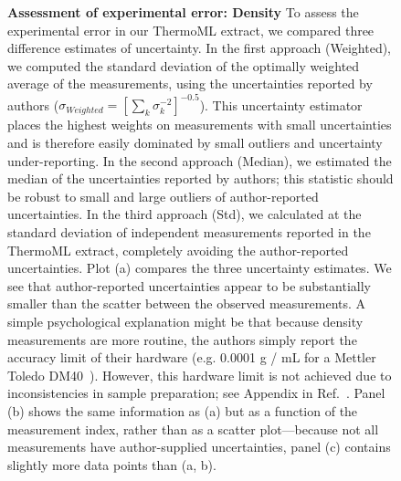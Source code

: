 \documentclass[aps,pre,twocolumn,nofootinbib,superscriptaddress,linenumbers]{revtex4-1}
\begin{document}
\begin{figure}
\caption{{\bf Assessment of experimental error: Density}
To assess the experimental error in our ThermoML extract, we compared three difference estimates of uncertainty.  
In the first approach (Weighted), we computed the standard deviation of the optimally weighted average of the measurements, using the uncertainties reported by authors ($\sigma_{Weighted} = [\sum_k \sigma_k^{-2}]^{-0.5}$).
This uncertainty estimator places the highest weights on measurements with small uncertainties and is therefore easily dominated by small outliers and uncertainty under-reporting.
In the second approach (Median), we estimated the median of the uncertainties reported by authors; this statistic should be robust to small and large outliers of author-reported uncertainties.
In the third approach (Std), we calculated at the standard deviation of independent measurements reported in the ThermoML extract, completely avoiding the author-reported uncertainties.
Plot (a) compares the three uncertainty estimates.
We see that author-reported uncertainties appear to be substantially smaller than the scatter between the observed measurements.
A simple psychological explanation might be that because density measurements are more routine, the authors simply report the accuracy limit of their hardware (e.g. 0.0001 g / mL for a Mettler Toledo DM40~\cite{mettlertoledo}).  
However, this hardware limit is not achieved due to inconsistencies in sample preparation; see Appendix in Ref.~\cite{chirico2013improvement}.  
Panel (b) shows the same information as (a) but as a function of the measurement index, rather than as a scatter plot---because not all measurements have author-supplied uncertainties, panel (c) contains slightly more data points than (a, b).  
}
\label{figure:ErrorAnalysisDensity}

\end{figure}



\clearpage
\end{document}
